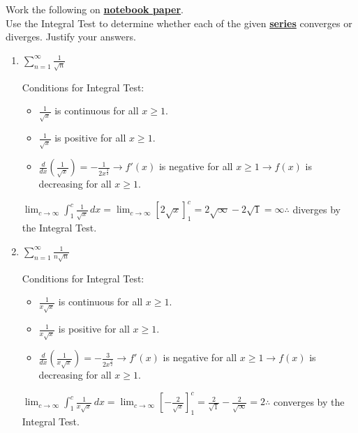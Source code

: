 \documentclass[10pt,letterpaper]{report}
\begin{document}
\noindent Work the following on \textbf{\underline{notebook paper}}. \\
\noindent Use the Integral Test to determine whether each of the given \textbf{\underline{series}} converges or diverges. Justify your answers. 
\begin{enumerate}
  \item{$\sum_{n=1}^{\infty}{\frac{1}{\sqrt{n}}}$ \\}
  
    Conditions for Integral Test: 
    \begin{itemize}
      \item{$\frac{1}{\sqrt{x}}$ is continuous for all $x \geq 1$.}
      \item{$\frac{1}{\sqrt{x}}$ is positive for all $x \geq 1$.}
      \item{$\frac{d}{dx}\left(\frac{1}{\sqrt{x}}\right) = -\frac{1}{2x^{\frac{3}{2}}} \rightarrow f'(x)$ is negative for all $x \geq 1 \rightarrow f(x)$ is decreasing for all $x \geq 1$. \\}
    \end{itemize}
  
    $\lim_{c\to\infty}\int_{1}^{c}{\frac{1}{\sqrt{x}}}\,dx = \lim_{c\to\infty}\left[2\sqrt{x}\right]_{1}^{c} = 2\sqrt{\infty}-2\sqrt{1}=\infty \therefore $ diverges by the Integral Test. \\
    
  \item{$\sum_{n=1}^{\infty}{\frac{1}{n\sqrt{n}}}$ \\}
  
    Conditions for Integral Test: 
    \begin{itemize}
      \item{$\frac{1}{x\sqrt{x}}$ is continuous for all $x \geq 1$.}
      \item{$\frac{1}{x\sqrt{x}}$ is positive for all $x \geq 1$.}
      \item{$\frac{d}{dx}\left(\frac{1}{x\sqrt{x}}\right) = -\frac{3}{2x^{\frac{5}{2}}} \rightarrow f'(x)$ is negative for all $x \geq 1 \rightarrow f(x)$ is decreasing for all $x \geq 1$. \\}
    \end{itemize}
  
    $\lim_{c\to\infty}\int_{1}^{c}{\frac{1}{x\sqrt{x}}}\,dx = \lim_{c\to\infty} \left[-\frac{2}{\sqrt{x}}\right]_{1}^{c} = \frac{2}{\sqrt{1}} - \frac{2}{\sqrt{\infty}} = 2 \therefore$ converges by the Integral Test. \\
    

\end{enumerate}
\end{document}
